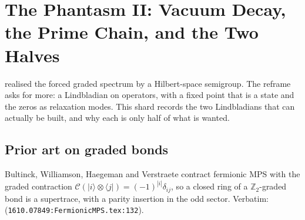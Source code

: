
\section{The Phantasm II: Vacuum Decay, the Prime Chain, and the Two Halves}
\label{sec:phantasm-channels}

 realised the forced graded spectrum by a Hilbert-space
semigroup. The reframe asks for more: a Lindbladian on operators, with a fixed point that
is a state and the zeros as relaxation modes. This shard records the two Lindbladians
that can actually be built, and why each is only half of what is wanted.

\subsection{Prior art on graded bonds}

\begin{citedfact}
\label{cit:fmps-supertrace}
Bultinck, Williamson, Haegeman and Verstraete \cite{bultinck2017fermionic} contract
fermionic MPS with the graded contraction $\mathcal C(|i\rangle\otimes\langle j|) =
(-1)^{|i|}\delta_{ij}$, so a closed ring of a $\mathbb Z_2$-graded bond is a supertrace,
with a parity insertion in the odd sector.
Verbatim: \texttt{} (\texttt{1610.07849:FermionicMPS.tex:132}).
\end{citedfact}

